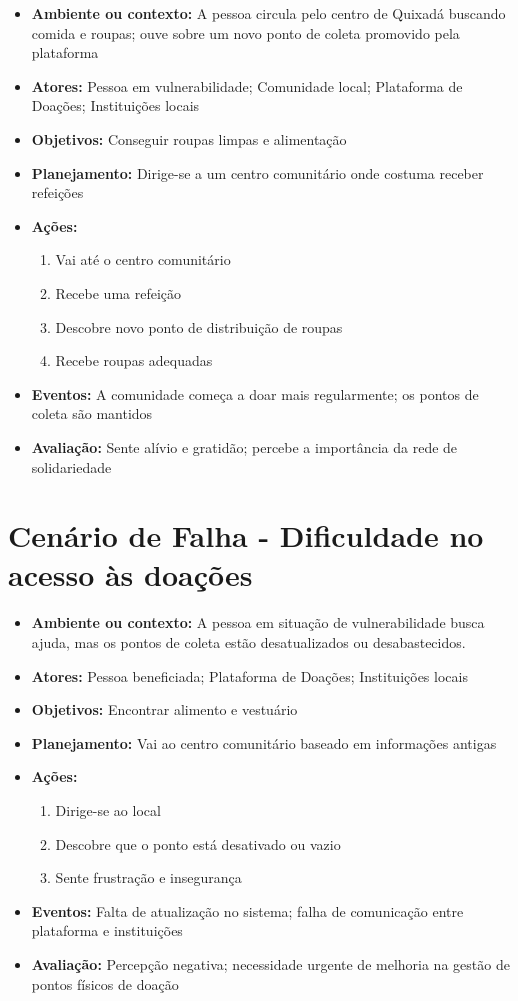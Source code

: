 \documentclass[a4paper,12pt]{article}
\begin{document}
\begin{itemize}
    \item \textbf{Ambiente ou contexto:} A pessoa circula pelo centro de Quixadá buscando comida e roupas; ouve sobre um novo ponto de coleta promovido pela plataforma
    \item \textbf{Atores:} Pessoa em vulnerabilidade; Comunidade local; Plataforma de Doações; Instituições locais
    \item \textbf{Objetivos:} Conseguir roupas limpas e alimentação
    \item \textbf{Planejamento:} Dirige-se a um centro comunitário onde costuma receber refeições
    \item \textbf{Ações:}
    \begin{enumerate}
        \item Vai até o centro comunitário
        \item Recebe uma refeição
        \item Descobre novo ponto de distribuição de roupas
        \item Recebe roupas adequadas
    \end{enumerate}
    \item \textbf{Eventos:} A comunidade começa a doar mais regularmente; os pontos de coleta são mantidos
    \item \textbf{Avaliação:} Sente alívio e gratidão; percebe a importância da rede de solidariedade
\end{itemize}

\section{Cenário de Falha - Dificuldade no acesso às doações}

\begin{itemize}
    \item \textbf{Ambiente ou contexto:} A pessoa em situação de vulnerabilidade busca ajuda, mas os pontos de coleta estão desatualizados ou desabastecidos.
    \item \textbf{Atores:} Pessoa beneficiada; Plataforma de Doações; Instituições locais
    \item \textbf{Objetivos:} Encontrar alimento e vestuário
    \item \textbf{Planejamento:} Vai ao centro comunitário baseado em informações antigas
    \item \textbf{Ações:}
    \begin{enumerate}
        \item Dirige-se ao local
        \item Descobre que o ponto está desativado ou vazio
        \item Sente frustração e insegurança
    \end{enumerate}
    \item \textbf{Eventos:} Falta de atualização no sistema; falha de comunicação entre plataforma e instituições
    \item \textbf{Avaliação:} Percepção negativa; necessidade urgente de melhoria na gestão de pontos físicos de doação
\end{itemize}
\end{document}
